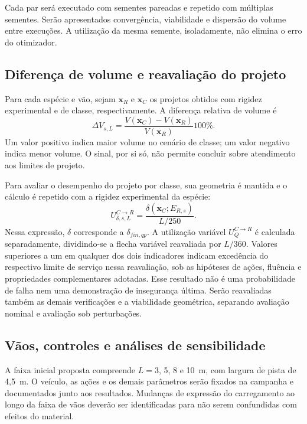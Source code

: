 Cada par será executado com sementes pareadas e repetido com múltiplas sementes. Serão apresentados convergência, viabilidade e dispersão do volume entre execuções. A utilização da mesma semente, isoladamente, não elimina o erro do otimizador.



\subsection{Diferença de volume e reavaliação do projeto}\label{sec:protocolo}

Para cada espécie e vão, sejam $\mathbf{x}_R$ e $\mathbf{x}_C$ os projetos obtidos com rigidez experimental e de classe, respectivamente. A diferença relativa de volume é
\begin{equation}
\Delta V_{s,L}=\frac{V(\mathbf{x}_C)-V(\mathbf{x}_R)}{V(\mathbf{x}_R)}100\%.
\label{eq:deltaV}
\end{equation}
Um valor positivo indica maior volume no cenário de classe; um valor negativo indica menor volume. O sinal, por si só, não permite concluir sobre atendimento aos limites de projeto.

Para avaliar o desempenho do projeto por classe, sua geometria é mantida e o cálculo é repetido com a rigidez experimental da espécie:
\begin{equation}
U_{\delta,s,L}^{C\rightarrow R}=\frac{\delta(\mathbf{x}_C;E_{R,s})}{L/250}.
\label{eq:reavaliacao}
\end{equation}
Nessa expressão, $\delta$ corresponde a $\delta_{fin,qp}$. A utilização variável $U_Q^{C\rightarrow R}$ é calculada separadamente, dividindo-se a flecha variável reavaliada por $L/360$. Valores superiores a um em qualquer dos dois indicadores indicam excedência do respectivo limite de serviço nessa reavaliação, sob as hipóteses de ações, fluência e propriedades complementares adotadas. Esse resultado não é uma probabilidade de falha nem uma demonstração de insegurança última. Serão reavaliadas também as demais verificações e a viabilidade geométrica, separando avaliação nominal e avaliação sob perturbações.

\subsection{Vãos, controles e análises de sensibilidade}\label{sec:vaos}

A faixa inicial proposta compreende $L=3$, 5, 8 e 10~m, com largura de pista de 4,5~m. O veículo, as ações e os demais parâmetros serão fixados na campanha e documentados junto aos resultados. Mudanças de expressão do carregamento ao longo da faixa de vãos deverão ser identificadas para não serem confundidas com efeitos do material.

